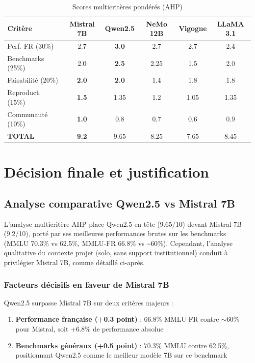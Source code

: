 \begin{table}[h]
\centering
\small
\caption{Scores multicritères pondérés (AHP)}
\label{tab:scores_ahp}
\begin{tabular}{@{}lccccc@{}}
\toprule
\textbf{Critère} & \textbf{Mistral 7B} & \textbf{Qwen2.5} & \textbf{NeMo 12B} & \textbf{Vigogne} & \textbf{LLaMA 3.1} \\ \midrule
Perf. FR (30\%) & 2.7 & \textbf{3.0} & 2.7 & 2.7 & 2.4 \\
Benchmarks (25\%) & 2.0 & \textbf{2.5} & 2.25 & 1.5 & 2.0 \\
Faisabilité (20\%) & \textbf{2.0} & \textbf{2.0} & 1.4 & 1.8 & 1.8 \\
Reproduct. (15\%) & \textbf{1.5} & 1.35 & 1.2 & 1.05 & 1.35 \\
Communauté (10\%) & \textbf{1.0} & 0.8 & 0.7 & 0.6 & 0.9 \\ \midrule
\textbf{TOTAL} & \textbf{9.2} & 9.65 & 8.25 & 7.65 & 8.45 \\ \bottomrule
\end{tabular}
\end{table}

\section{Décision finale et justification}

\subsection{Analyse comparative Qwen2.5 vs Mistral 7B}

L'analyse multicritère AHP place Qwen2.5 en tête (9.65/10) devant Mistral 7B (9.2/10), porté par ses meilleures performances brutes sur les benchmarks (MMLU 70.3\% vs 62.5\%, MMLU-FR 66.8\% vs \textasciitilde{}60\%). Cependant, l'analyse qualitative du contexte projet (solo, sans support institutionnel) conduit à privilégier Mistral 7B, comme détaillé ci-après.

\subsubsection{Facteurs décisifs en faveur de Mistral 7B}

Qwen2.5 surpasse Mistral 7B sur deux critères majeurs :

\begin{enumerate}
    \item \textbf{Performance française (+0.3 point)} : 66.8\% MMLU-FR contre $\sim$60\% pour Mistral, soit +6.8\% de performance absolue \citep{yang2024qwen25}
    
    \item \textbf{Benchmarks généraux (+0.5 point)} : 70.3\% MMLU contre 62.5\%, positionnant Qwen2.5 comme le meilleur modèle 7B sur ce benchmark
\end{enumerate}

